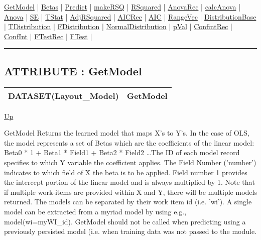 \hyperlink{ecldoc:linearregression.ols.getmodel}{GetModel}  |
\hyperlink{ecldoc:linearregression.ols.betas}{Betas}  |
\hyperlink{ecldoc:linearregression.ols.predict}{Predict}  |
\hyperlink{ecldoc:linearregression.ols.makersq}{makeRSQ}  |
\hyperlink{ecldoc:linearregression.ols.rsquared}{RSquared}  |
\hyperlink{ecldoc:linearregression.ols.anovarec}{AnovaRec}  |
\hyperlink{ecldoc:linearregression.ols.calcanova}{calcAnova}  |
\hyperlink{ecldoc:linearregression.ols.anova}{Anova}  |
\hyperlink{ecldoc:linearregression.ols.se}{SE}  |
\hyperlink{ecldoc:linearregression.ols.tstat}{TStat}  |
\hyperlink{ecldoc:linearregression.ols.adjrsquared}{AdjRSquared}  |
\hyperlink{ecldoc:linearregression.ols.aicrec}{AICRec}  |
\hyperlink{ecldoc:linearregression.ols.aic}{AIC}  |
\hyperlink{ecldoc:linearregression.ols.rangevec}{RangeVec}  |
\hyperlink{ecldoc:linearregression.ols.distributionbase}{DistributionBase}  |
\hyperlink{ecldoc:linearregression.ols.tdistribution}{TDistribution}  |
\hyperlink{ecldoc:linearregression.ols.fdistribution}{FDistribution}  |
\hyperlink{ecldoc:linearregression.ols.normaldistribution}{NormalDistribution}  |
\hyperlink{ecldoc:linearregression.ols.pval}{pVal}  |
\hyperlink{ecldoc:linearregression.ols.confintrec}{ConfintRec}  |
\hyperlink{ecldoc:linearregression.ols.confint}{ConfInt}  |
\hyperlink{ecldoc:linearregression.ols.ftestrec}{FTestRec}  |
\hyperlink{ecldoc:linearregression.ols.ftest}{FTest}  |

\rule{\textwidth}{0.4pt}

\subsection*{ATTRIBUTE : GetModel}
\hypertarget{ecldoc:linearregression.ols.getmodel}{}

{\renewcommand{\arraystretch}{1.5}
\begin{tabularx}{\textwidth}{|>{\raggedright\arraybackslash}l|X|}
\hline
\hspace{0pt}DATASET(Layout\_Model) & GetModel \\
\hline
\end{tabularx}
}

\hyperlink{ecldoc:linearregression.ols}{Up}

\par
GetModel Returns the learned model that maps X's to Y's. In the case of OLS, the model represents a set of Betas which are the coefficients of the linear model: Beta0 * 1 + Beta1 * Field1 + Beta2 * Field2 \ldots The ID of each model record specifies to which Y variable the coefficient applies. The Field Number ('number') indicates to which field of X the beta is to be applied. Field number 1 provides the intercept portion of the linear model and is always multiplied by 1. Note that if multiple work-items are provided within X and Y, there will be multiple models returned. The models can be separated by their work item id (i.e. 'wi'). A single model can be extracted from a myriad model by using e.g., model(wi=myWI\_id). GetModel should not be called when predicting using a previously persisted model (i.e. when training data was not passed to the module.

